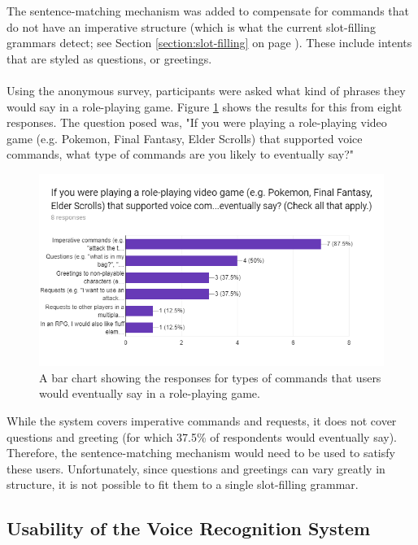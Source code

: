 \documentclass[11pt]{article}
\begin{document}
The sentence-matching mechanism was added to compensate for commands that do not have an imperative structure (which is what the current slot-filling grammars detect; see Section \ref{section:slot-filling} on page \pageref{section:slot-filling}). These include intents that are styled as questions, or greetings.
\\
\\
Using the anonymous survey, participants were asked what kind of phrases they would say in a role-playing game. Figure \ref{fig:survey-commands} shows the results for this from eight responses. The question posed was, "If you were playing a role-playing video game (e.g. Pokemon, Final Fantasy, Elder Scrolls) that supported voice commands, what type of commands are you likely to eventually say?"

\begin{center}
\begin{figure}[]
\begin{center}
  \includegraphics[width=\linewidth]{survey-commands}
  \caption{A bar chart showing the responses for types of commands that users would eventually say in a role-playing game.}
  \label{fig:survey-commands}
  \end{center}
\end{figure}
\end{center}

While the system covers imperative commands and requests, it does not cover questions and greeting (for which 37.5\% of respondents  would eventually say). Therefore, the sentence-matching mechanism would need to be used to satisfy these users. Unfortunately, since questions and greetings can vary greatly in structure, it is not possible to fit them to a single slot-filling grammar.

\subsection{Usability of the Voice Recognition System}
\end{document}
